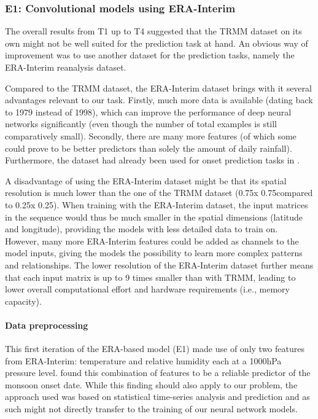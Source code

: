 \subsubsection{E1: Convolutional models using ERA-Interim}
\label{sst:nn_e1}
The overall results from T1 up to T4 suggested that the TRMM dataset on its own might not be well suited for the prediction task at hand. An obvious way of improvement was to use another dataset for the prediction tasks, namely the ERA-Interim reanalysis dataset.

Compared to the TRMM dataset, the ERA-Interim dataset brings with it several advantages relevant to our task. Firstly, much more data is available (dating back to 1979 instead of 1998), which can improve the performance of deep neural networks significantly (even though the number of total examples is still comparatively small). Secondly, there are many more features (of which some could prove to be better predictors than solely the amount of daily rainfall). Furthermore, the dataset had already been used for onset prediction tasks in \citep{Stolbova.2015}.

A disadvantage of using the ERA-Interim dataset might be that its spatial resolution is much lower than the one of the TRMM dataset (0.75\degree x 0.75\degree compared to 0.25\degree x 0.25\degree). When training with the ERA-Interim dataset, the input matrices in the sequence would thus be much smaller in the spatial dimensions (latitude and longitude), providing the models with less detailed data to train on. However, many more ERA-Interim features could be added as channels to the model inputs, giving the models the possibility to learn more complex patterns and relationships. The lower resolution of the ERA-Interim dataset further means that each input matrix is up to 9 times smaller than with TRMM, leading to lower overall computational effort and hardware requirements (i.e., memory capacity).

\paragraph{Data preprocessing}
\label{ssst:nn_e1_data}
This first iteration of the ERA-based model (E1) made use of only two features from ERA-Interim: temperature and relative humidity each at a 1000hPa pressure level. \citet{Stolbova.2015} found this combination of features to be a reliable predictor of the monsoon onset date. While this finding should also apply to our problem, the approach used was based on statistical time-series analysis and prediction and as such might not directly transfer to the training of our neural network models.

